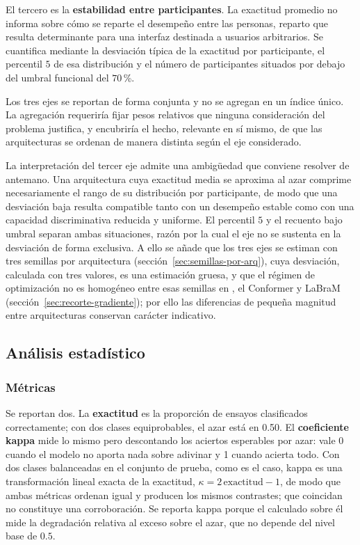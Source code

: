 El tercero es la \textbf{estabilidad entre participantes}. La exactitud promedio no informa
sobre cómo se reparte el desempeño entre las personas, reparto que resulta determinante
para una interfaz destinada a usuarios arbitrarios. Se cuantifica mediante la desviación
típica de la exactitud por participante, el percentil $5$ de esa distribución y el número
de participantes situados por debajo del umbral funcional del $70$\,\%.

Los tres ejes se reportan de forma conjunta y no se agregan en un índice único. La
agregación requeriría fijar pesos relativos que ninguna consideración del problema
justifica, y encubriría el hecho, relevante en sí mismo, de que las arquitecturas se
ordenan de manera distinta según el eje considerado.

La interpretación del tercer eje admite una ambigüedad que conviene resolver de antemano.
Una arquitectura cuya exactitud media se aproxima al azar comprime necesariamente el rango
de su distribución por participante, de modo que una desviación baja resulta compatible
tanto con un desempeño estable como con una capacidad discriminativa reducida y uniforme.
El percentil $5$ y el recuento bajo umbral separan ambas situaciones, razón por la cual el
eje no se sustenta en la desviación de forma exclusiva. A ello se añade que los tres ejes
se estiman con tres semillas por arquitectura (sección~\ref{sec:semillas-por-arq}), cuya
desviación, calculada con tres valores, es una estimación gruesa, y que el régimen de
optimización no es homogéneo entre esas semillas en \eegnet{}, el Conformer y LaBraM
(sección~\ref{sec:recorte-gradiente}); por ello las diferencias de pequeña magnitud entre
arquitecturas conservan carácter indicativo.

\subsection{Análisis estadístico}
\label{sec:estadistica}

\subsubsection{Métricas}

Se reportan dos. La \textbf{exactitud} es la proporción de ensayos clasificados
correctamente; con dos clases equiprobables, el azar está en 0.50. El
\textbf{coeficiente kappa} \cite{cohen1960} mide lo mismo pero descontando los aciertos
esperables por azar: vale 0 cuando el modelo no aporta nada sobre adivinar y 1
cuando acierta todo. Con dos clases balanceadas en el conjunto de prueba, como es el caso,
kappa es una transformación lineal exacta de la exactitud, $\kappa = 2\,\mathrm{exactitud}-1$,
de modo que ambas métricas ordenan igual y producen los mismos contrastes; que coincidan no
constituye una corroboración. Se reporta kappa porque el \dsi{} calculado sobre él mide la
degradación relativa al exceso sobre el azar, que no depende del nivel base de $0.5$.

